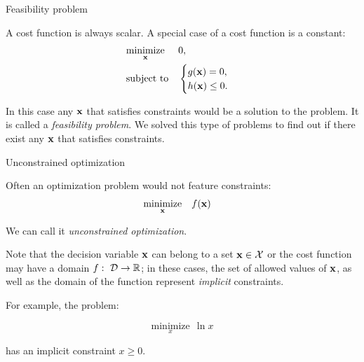 \documentclass{beamer}
\begin{document}
\begin{frame}{Feasibility problem}
	\begin{flushleft}
		
		A cost function is always scalar. A special case of a cost function is a constant:
		\begin{equation}
			\begin{aligned}
				& \underset{\mathbf{x}}{\text{minimize}}
				& & 0, \\
				& \text{subject to}
				& & \begin{cases}
					g(\mathbf{x}) = 0, \\
					h(\mathbf{x}) \leq 0.
				\end{cases}
			\end{aligned}
		\end{equation}
	
		In this case any $\mathbf{x}$ that satisfies constraints would be a solution to the problem. It is called a \emph{feasibility problem}. We solved this type of problems to find out if there exist any $\mathbf{x}$ that satisfies constraints.
		
	\end{flushleft}
\end{frame}




\begin{frame}{Unconstrained optimization}
	\begin{flushleft}
		
		Often an optimization problem would not feature constraints:
		\begin{equation}
			\begin{aligned}
				& \underset{\mathbf{x}}{\text{minimize}}
				& & f(\mathbf{x})
			\end{aligned}
		\end{equation}
		
		We can call it \emph{unconstrained optimization}.
		
		\bigskip
		
		Note that the decision variable $\mathbf{x}$ can belong to a set $\mathbf{x} \in \mathcal{X}$ or the cost function may have a domain $f: \ \mathcal{D} \rightarrow \mathbb{R}$; in these cases, the set of allowed values of $\mathbf{x}$, as well as the domain of the function represent \emph{implicit} constraints. 
		
		\bigskip
		
		For example, the problem:
		
		$$\underset{x}{\text{minimize}} \ \ \ln x$$
		
		has an implicit constraint $x \geq 0$.
		
	\end{flushleft}
\end{frame}
\end{document}
